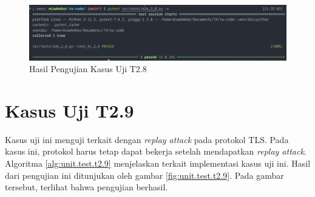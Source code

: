 \begin{figure}[ht]
  \centering
  \includegraphics[width=\textwidth]{chapters/res/appendix-4/2.8.png}
  \caption{Hasil Pengujian Kasus Uji T2.8}
  \label{fig:unit.test.t2.8}
\end{figure}

\section{Kasus Uji T2.9}

Kasus uji ini menguji terkait dengan \emph{replay attack} pada protokol TLS. Pada kasus ini, protokol harus tetap dapat bekerja setelah mendapatkan \emph{replay attack}. Algoritma \ref{alg:unit.test.t2.9} menjelaskan terkait implementasi kasus uji ini. Hasil dari pengujian ini ditunjukan oleh gambar \ref{fig:unit.test.t2.9}. Pada gambar tersebut, terlihat bahwa pengujian berhasil.


